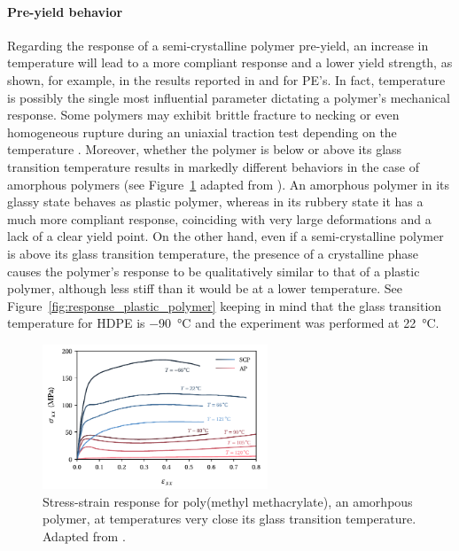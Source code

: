 \paragraph{Pre-yield behavior}
Regarding the response of a semi-crystalline polymer pre-yield, an increase in temperature will lead to a more compliant response and a lower yield strength, as shown, for example, in the results reported in \cite{brownInfluenceMolecularConformation2007} and \cite{hobeikaTemperatureStrainRate2000} for PE's.
In fact, temperature is possibly the single most influential parameter dictating a polymer's mechanical response.
Some polymers may exhibit brittle fracture to necking or even homogeneous rupture during an uniaxial traction test depending on the temperature \citep{wardIntroductionMechanicalProperties2004}.
Moreover, whether the polymer is below or above its glass transition temperature results in markedly different behaviors in the case of amorphous polymers (see Figure~\ref{fig:scheme_effect_temperature} adapted from \cite{vanloockDeformationFailureMaps2018}).
An amorphous polymer in its glassy state behaves as plastic polymer, whereas in its rubbery state it has a much more compliant response, coinciding with very large deformations and a lack of a clear yield point.
On the other hand, even if a semi-crystalline polymer is above its glass transition temperature, the presence of a crystalline phase causes the polymer's response to be qualitatively similar to that of a plastic polymer, although less stiff than it would be at a lower temperature.
See Figure~\ref{fig:response_plastic_polymer} keeping in mind that the glass transition temperature for HDPE is \SI{-90}{\celsius}  \citep{callister2014materials} and the experiment was performed at \SI{22}{\celsius}.
\begin{figure}[hbtp]
	\centering
	\includegraphics[width=0.6\textwidth]{figures/scheme_effect_temperature}
	\caption{Stress-strain response for poly(methyl methacrylate), an amorhpous polymer, at temperatures very close its glass transition temperature. Adapted from \cite{vanloockDeformationFailureMaps2018}.}
\label{fig:scheme_effect_temperature}
\end{figure}

